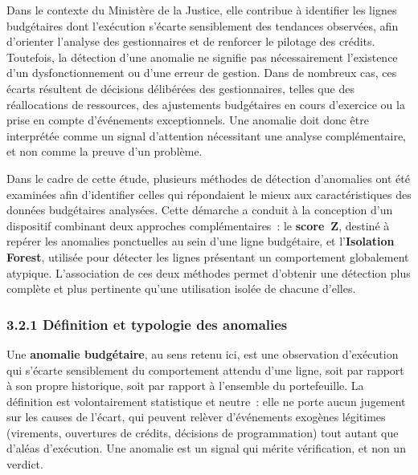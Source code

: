 Dans le contexte du Minist\`ere de la Justice, elle contribue \`a identifier
les lignes budg\'etaires dont l'ex\'ecution s'\'ecarte sensiblement des
tendances observ\'ees, afin d'orienter l'analyse des gestionnaires et de
renforcer le pilotage des cr\'edits. Toutefois, la d\'etection d'une anomalie
ne signifie pas n\'ecessairement l'existence d'un dysfonctionnement ou d'une
erreur de gestion. Dans de nombreux cas, ces \'ecarts r\'esultent de
d\'ecisions d\'elib\'er\'ees des gestionnaires, telles que des r\'eallocations
de ressources, des ajustements budg\'etaires en cours d'exercice ou la prise
en compte d'\'ev\'enements exceptionnels. Une anomalie doit donc \^etre
interpr\'et\'ee comme un signal d'attention n\'ecessitant une analyse
compl\'ementaire, et non comme la preuve d'un probl\`eme.

Dans le cadre de cette \'etude, plusieurs m\'ethodes de d\'etection d'anomalies
ont \'et\'e examin\'ees afin d'identifier celles qui r\'epondaient le mieux aux
caract\'eristiques des donn\'ees budg\'etaires analys\'ees. Cette d\'emarche a
conduit \`a la conception d'un dispositif combinant deux approches
compl\'ementaires~: le \textbf{score~Z}, destin\'e \`a rep\'erer les anomalies
ponctuelles au sein d'une ligne budg\'etaire, et l'\textbf{Isolation Forest},
utilis\'ee pour d\'etecter les lignes pr\'esentant un comportement globalement
atypique. L'association de ces deux m\'ethodes permet d'obtenir une d\'etection
plus compl\`ete et plus pertinente qu'une utilisation isol\'ee de chacune
d'elles.

\subsubsection*{3.2.1 \quad D\'efinition et typologie des anomalies}

Une \textbf{anomalie budg\'etaire}, au sens retenu ici, est une observation
d'ex\'ecution qui s'\'ecarte sensiblement du comportement attendu d'une ligne,
soit par rapport \`a son propre historique, soit par rapport \`a l'ensemble du
portefeuille. La d\'efinition est volontairement statistique et neutre~: elle
ne porte aucun jugement sur les causes de l'\'ecart, qui peuvent rel\`ever
d'\'ev\'enements exog\`enes l\'egitimes (virements, ouvertures de cr\'edits,
d\'ecisions de programmation) tout autant que d'al\'eas d'ex\'ecution. Une
anomalie est un signal qui m\'erite v\'erification, et non un verdict.

